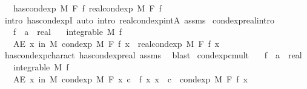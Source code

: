 \begin{isabellebody}
\ \ \ {\isachardoublequoteopen}has{\isacharunderscore}{\kern0pt}cond{\isacharunderscore}{\kern0pt}exp\ M\ F\ f\ {\isacharparenleft}{\kern0pt}real{\isacharunderscore}{\kern0pt}cond{\isacharunderscore}{\kern0pt}exp\ M\ F\ f{\isacharparenright}{\kern0pt}{\isachardoublequoteclose}\isanewline
%
\isadelimproof
\ \ %
\endisadelimproof
%
\isatagproof
{}\isamarkupfalse%
\ {\isacharparenleft}{\kern0pt}intro\ has{\isacharunderscore}{\kern0pt}cond{\isacharunderscore}{\kern0pt}expI{\isacharprime}{\kern0pt}{\isacharcomma}{\kern0pt}\ auto\ intro{\isacharbang}{\kern0pt}{\isacharcolon}{\kern0pt}\ real{\isacharunderscore}{\kern0pt}cond{\isacharunderscore}{\kern0pt}exp{\isacharunderscore}{\kern0pt}intA\ assms{\isacharparenright}{\kern0pt}%
\endisatagproof
{\isafoldproof}%
%
\isadelimproof
\isanewline
%
\endisadelimproof
\isanewline
{}\isamarkupfalse%
\ cond{\isacharunderscore}{\kern0pt}exp{\isacharunderscore}{\kern0pt}real{\isacharbrackleft}{\kern0pt}intro{\isacharbrackright}{\kern0pt}{\isacharcolon}{\kern0pt}\isanewline
\ \ \ f\ {\isacharcolon}{\kern0pt}{\isacharcolon}{\kern0pt}\ {\isachardoublequoteopen}{\isacharprime}{\kern0pt}a\ {\isasymRightarrow}\ real{\isachardoublequoteclose}\isanewline
\ \ \ {\isachardoublequoteopen}integrable\ M\ f{\isachardoublequoteclose}\isanewline
\ \ \ {\isachardoublequoteopen}AE\ x\ in\ M{\isachardot}{\kern0pt}\ cond{\isacharunderscore}{\kern0pt}exp\ M\ F\ f\ x\ {\isacharequal}{\kern0pt}\ real{\isacharunderscore}{\kern0pt}cond{\isacharunderscore}{\kern0pt}exp\ M\ F\ f\ x{\isachardoublequoteclose}\ \isanewline
%
\isadelimproof
\ \ %
\endisadelimproof
%
\isatagproof
{}\isamarkupfalse%
\ has{\isacharunderscore}{\kern0pt}cond{\isacharunderscore}{\kern0pt}exp{\isacharunderscore}{\kern0pt}charact\ has{\isacharunderscore}{\kern0pt}cond{\isacharunderscore}{\kern0pt}exp{\isacharunderscore}{\kern0pt}real\ assms\ \isamarkupfalse%
\ blast%
\endisatagproof
{\isafoldproof}%
%
\isadelimproof
\isanewline
%
\endisadelimproof
\isanewline
{}\isamarkupfalse%
\ cond{\isacharunderscore}{\kern0pt}exp{\isacharunderscore}{\kern0pt}cmult{\isacharcolon}{\kern0pt}\isanewline
\ \ \ f\ {\isacharcolon}{\kern0pt}{\isacharcolon}{\kern0pt}\ {\isachardoublequoteopen}{\isacharprime}{\kern0pt}a\ {\isasymRightarrow}\ real{\isachardoublequoteclose}\isanewline
\ \ \ {\isachardoublequoteopen}integrable\ M\ f{\isachardoublequoteclose}\isanewline
\ \ \ {\isachardoublequoteopen}AE\ x\ in\ M{\isachardot}{\kern0pt}\ cond{\isacharunderscore}{\kern0pt}exp\ M\ F\ {\isacharparenleft}{\kern0pt}{\isasymlambda}x{\isachardot}{\kern0pt}\ c\ {\isacharasterisk}{\kern0pt}\ f\ x{\isacharparenright}{\kern0pt}\ x\ {\isacharequal}{\kern0pt}\ c\ {\isacharasterisk}{\kern0pt}\ cond{\isacharunderscore}{\kern0pt}exp\ M\ F\ f\ x{\isachardoublequoteclose}\isanewline

\end{isabellebody}
